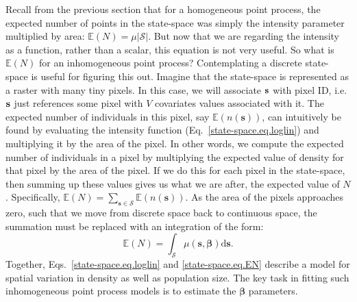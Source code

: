 Recall from the previous section that for a homogeneous point process,
the expected number of points in the state-space was simply the
intensity parameter multiplied by area: $\mathbb{E}(N) =
\mu|\mathcal{S}|$. But now that we are regarding the intensity as a
function, rather than a scalar, this equation is not very useful. So
what is $\mathbb{E}(N)$ for an inhomogeneous point process?
Contemplating a discrete state-space is useful for figuring this
out. Imagine that the state-space is represented as a raster with many
tiny pixels. In this case, we will associate
$\bf s$ with pixel ID, i.e. $\bf s$ just references some pixel with
$V$ covariates values associated with it. The expected number of
individuals in this pixel, say $\mathbb{E}(n(\mathbf{s}))$, can intuitively be
found by evaluating the intensity function
(Eq.~\ref{state-space.eq.loglin}) and multiplying it by the area of
the pixel. In other words, we compute the expected number of
individuals in a pixel by multiplying the expected value of density
for that pixel by the area of the pixel. If we do this for each pixel in the state-space, then
summing up these values gives us what we are after, the expected value
of $N$. Specifically,
$\mathbb{E}(N) = \sum_{\mathbf{s} \in \mathcal{S}}
\mathbb{E}(n(\mathbf{s}))$.
As the area of the pixels approaches zero, such that we move from discrete
space back to continuous space, the summation must be replaced
with an integration of the form:
\begin{equation}
\mathbb{E}(N) = \int_{\mathcal{S}} \mu(\mathbf{s}, {\bm \beta}) \mathrm{d}\mathbf{s}.
\label{state-space.eq.EN}
\end{equation}
Together, Eqs.~\ref{state-space.eq.loglin} and \ref{state-space.eq.EN}
describe a model for spatial variation in density as well as
population size. The key task in fitting such inhomogeneous point
process models is to estimate the $\bm \beta$
parameters.

